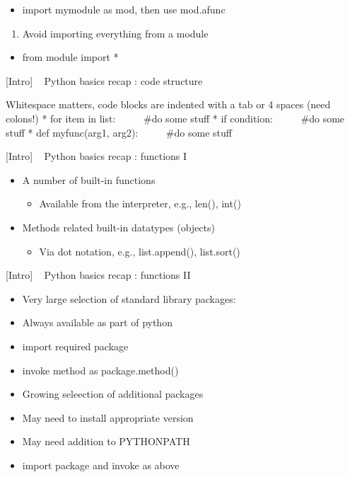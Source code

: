\documentclass{article}
\begin{document}
\begin{itemize}
\itemsep1pt\parskip0pt
\item
  import mymodule as mod, then use mod.afunc
\end{itemize}

\begin{enumerate}
\def\labelenumi{\arabic{enumi}.}
\setcounter{enumi}{3}
\itemsep1pt\parskip0pt
\item
  Avoid importing everything from a module
\end{enumerate}

\begin{itemize}
\itemsep1pt\parskip0pt
\item
  from module import *
\end{itemize}

    {[}Intro{]} ~ Python basics recap : code structure

Whitespace matters, code blocks are indented with a tab or 4 spaces
(need colons!) * for item in list: ~ ~ ~ \#do some stuff * if condition:
~ ~ ~ \#do some stuff * def myfunc(arg1, arg2): ~ ~ ~ \#do some stuff 

    {[}Intro{]} ~ Python basics recap : functions I

\begin{itemize}
\itemsep1pt\parskip0pt
\item
  A number of built-in functions

  \begin{itemize}
  \itemsep1pt\parskip0pt
  \item
    Available from the interpreter, e.g., len(), int() 
  \end{itemize}
\item
  Methods related built-in datatypes (objects)

  \begin{itemize}
  \itemsep1pt\parskip0pt
  \item
    Via dot notation, e.g., list.append(), list.sort()
  \end{itemize}
\end{itemize}

    {[}Intro{]} ~ Python basics recap : functions II

\begin{itemize}
\itemsep1pt\parskip0pt
\item
  Very large selection of standard library packages:
\item
  Always available as part of python
\item
  import required package
\item
  invoke method as package.method()
\item
  Growing seleection of additional packages
\item
  May need to install appropriate version
\item
  May need addition to PYTHONPATH
\item
  import package and invoke as above
\end{itemize}
\end{document}
